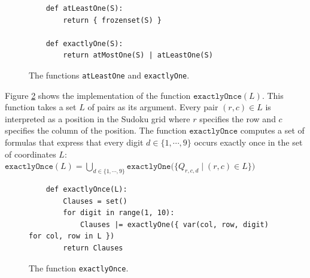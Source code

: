 \begin{figure}[!ht]
\centering
\begin{verbatim}
    def atLeastOne(S):
        return { frozenset(S) }
    
    def exactlyOne(S):
        return atMostOne(S) | atLeastOne(S)
\end{verbatim}
\vspace*{-0.3cm}
\caption{The functions \texttt{atLeastOne} and \texttt{exactlyOne}.}
\label{fig:sudoku-exactly}
\end{figure}

Figure \ref{fig:sudoku-exactlyOnce} shows the implementation of the function
$\texttt{exactlyOnce}(L)$.  This function takes a set $L$ of pairs as its argument.  Every pair $(r,c) \in L$ is
interpreted as a position in the Sudoku grid where $r$ specifies the row and $c$ specifies the column of the
position.  The function $\texttt{exactlyOnce}$ computes a set of formulas that express that every digit
$d \in \{1,\cdots,9\}$ occurs exactly once in the set of coordinates $L$: 
\\[0.2cm]
\hspace*{1.3cm}
$\texttt{exactlyOnce}(L) = \bigcup\limits_{d \in \{1,\cdots,9\}} \mathtt{exactlyOne}\bigl(\bigl\{ Q_{r,c,d} \mid (r,c) \in L \bigl\}\bigr)$


\begin{figure}[!ht]
\centering
\begin{verbatim}
    def exactlyOnce(L):
        Clauses = set()
        for digit in range(1, 10):
            Clauses |= exactlyOne({ var(col, row, digit)  for col, row in L })
        return Clauses
\end{verbatim}
\vspace*{-0.3cm}
\caption{The function \texttt{exactlyOnce}.}
\label{fig:sudoku-exactlyOnce}
\end{figure}

